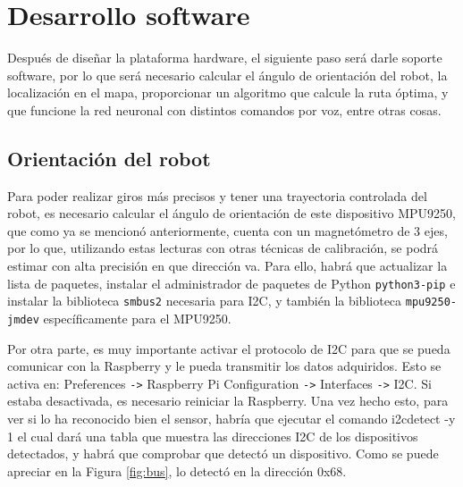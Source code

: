\section{Desarrollo software}
\label{sec:desarrollo_software}

Después de diseñar la plataforma hardware, el siguiente paso será darle soporte software, por lo que será necesario calcular el ángulo de orientación del robot, la localización en el mapa, proporcionar un algoritmo que calcule la ruta óptima, y que funcione la red neuronal con distintos comandos por voz, entre otras cosas.


\subsection{Orientación del robot}
\label{subsec:orientacion_robot}

Para poder realizar giros más precisos y tener una trayectoria controlada del robot, es necesario calcular el ángulo de orientación de este dispositivo MPU9250, que como ya se mencionó anteriormente, cuenta con un magnetómetro de 3 ejes, por lo que, utilizando estas lecturas con otras técnicas de calibración, se podrá estimar con alta precisión en que dirección va. Para ello, habrá que actualizar la lista de paquetes, instalar el administrador de paquetes de Python \verb|python3-pip|  e instalar la biblioteca \verb|smbus2| necesaria para I2C, y también la biblioteca \verb|mpu9250-jmdev| específicamente para el MPU9250.



Por otra parte, es muy importante activar el protocolo de I2C para que se pueda comunicar con la Raspberry y le pueda transmitir los datos adquiridos. Esto se activa en: Preferences \texttt{->} Raspberry Pi Configuration \texttt{->} Interfaces \texttt{->} I2C. Si estaba desactivada, es necesario reiniciar la Raspberry. Una vez hecho esto, para ver si lo ha reconocido bien el sensor, habría que ejecutar el comando i2cdetect -y 1 el cual dará una tabla que muestra las direcciones I2C de los dispositivos detectados, y habrá que comprobar que detectó un dispositivo. Como se puede apreciar en la Figura \ref{fig:bus}, lo detectó en la dirección 0x68.


